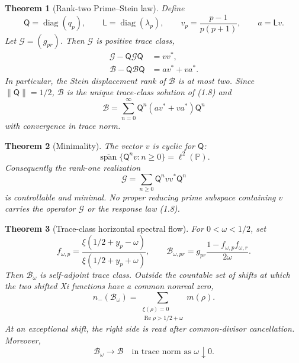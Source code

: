 \documentclass[11pt]{article}
\newtheorem{theorem}{Theorem}[section]
\theoremstyle{definition}
\theoremstyle{remark}
\newcommand{\PP}{\mathbb P}
\newcommand{\cB}{\mathcal B}
\newcommand{\cG}{\mathcal G}
\newcommand{\diag}{\operatorname{diag}}
\newcommand{\nm}{n_{-}}
\newcommand{\Rea}{\operatorname{Re}}
\newcommand{\norm}[1]{\lVert #1\rVert}
\begin{document}
\begin{theorem}[Rank-two Prime--Stein law]
\label{thm:stein}
Define
\begin{equation}
 \mathsf Q=\diag(q_p),\qquad
 \mathsf L=\diag(\lambda_p),\qquad
 v_p=\frac{p-1}{p(p+1)},\qquad
 a=\mathsf L v.                                            \tag{1.6}
\end{equation}
Let $\cG=(g_{pr})$.  Then $\cG$ is positive trace class,
\begin{align}
 \cG-\mathsf Q\cG\mathsf Q&=vv^*,                          \tag{1.7}\\
 \cB-\mathsf Q\cB\mathsf Q&=av^*+va^*.                     \tag{1.8}
\end{align}
In particular, the Stein displacement rank of $\cB$ is at most two.  Since
$\norm{\mathsf Q}=1/2$, $\cB$ is the unique trace-class solution of \emph{(1.8)} and
\begin{equation}
 \cB=\sum_{n=0}^{\infty}
 \mathsf Q^n(av^*+va^*)\mathsf Q^n                       \tag{1.9}
\end{equation}
with convergence in trace norm.
\end{theorem}

\begin{theorem}[Minimality]
\label{thm:minimal}
The vector $v$ is cyclic for $\mathsf Q$:
\begin{equation}
 \overline{\operatorname{span}}\{\mathsf Q^nv:n\geq0\}
 =\ell^2(\PP).                                             \tag{1.10}
\end{equation}
Consequently the rank-one realization
\[
 \cG=\sum_{n\geq0}\mathsf Q^nvv^*\mathsf Q^n
\]
is controllable and minimal.  No proper reducing prime subspace containing $v$ carries the
operator $\cG$ or the response law \emph{(1.8)}.
\end{theorem}

\begin{theorem}[Trace-class horizontal spectral flow]
\label{thm:flow}
For $0<\omega<1/2$, set
\begin{equation}
 f_{\omega,p}
 =\frac{\xi(1/2+y_p-\omega)}
        {\xi(1/2+y_p+\omega)},\qquad
 \cB_{\omega,pr}
 =g_{pr}\frac{1-f_{\omega,p}f_{\omega,r}}{2\omega}.         \tag{1.11}
\end{equation}
Then $\cB_\omega$ is self-adjoint trace class.  Outside the countable set of shifts at which the
two shifted Xi functions have a common nonreal zero,
\begin{equation}
 \nm(\cB_\omega)
 =\sum_{\substack{\xi(\rho)=0\\
          \Rea\rho>1/2+\omega}}m(\rho).                    \tag{1.12}
\end{equation}
At an exceptional shift, the right side is read after common-divisor cancellation.  Moreover,
\begin{equation}
 \cB_\omega\longrightarrow\cB
 \quad\text{in trace norm as }\omega\downarrow0.            \tag{1.13}
\end{equation}
\end{theorem}
\end{document}
